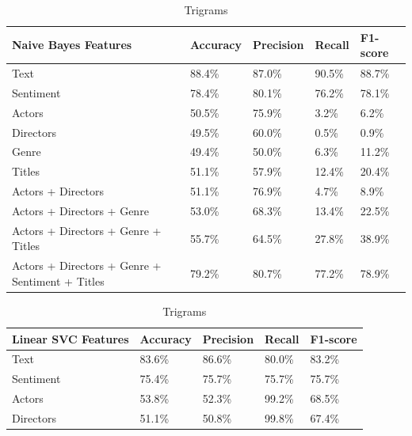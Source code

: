 \documentclass[
10pt, %
a4paper, %
oneside, %
headinclude,footinclude, %
] {book}%
\begin{document}
\begin{table}[hbtp]
\centering
\caption{Trigrams}
\label{Table 5}
\begin{tabular}{@{}lllll@{}}
\toprule
Naive Bayes Features                           & Accuracy & Precision & Recall & F1-score \\ \midrule
Text                              & 88.4\%       & 87.0\%          & 90.5\%       & 88.7\%         \\
Sentiment                         & 78.4\%         & 80.1\%          & 76.2\%       & 78.1\%         \\
Actors                            & 50.5\%         & 75.9\%          & 3.2\%       & 6.2\%         \\
Directors                         & 49.5\%         & 60.0\%          & 0.5\%       & 0.9\%         \\
Genre                             & 49.4\%         & 50.0\%          & 6.3\%       & 11.2\%         \\
Titles                            & 51.1\%         & 57.9\%          & 12.4\%       & 20.4\%         \\
Actors + Directors                        & 51.1\%         & 76.9\%          & 4.7\%       & 8.9\%         \\
Actors + Directors + Genre                        & 53.0\%         & 68.3\%          & 13.4\%       & 22.5\%         \\
Actors + Directors + Genre + Titles                       & 55.7\%         & 64.5\%          & 27.8\%       & 38.9\%         \\
Actors + Directors + Genre + Sentiment + Titles                    & 79.2\%         & 80.7\%          & 77.2\%       & 78.9\%         \\ 
\end{tabular}
\begin{tabular}{@{}lllll@{}}
\toprule
Linear SVC Features                           & Accuracy & Precision & Recall & F1-score \\ \midrule
Text                              & 83.6\%       & 86.6\%          & 80.0\%       & 83.2\%         \\
Sentiment                         & 75.4\%         & 75.7\%          & 75.7\%       & 75.7\%         \\
Actors                            & 53.8\%         & 52.3\%          & 99.2\%       & 68.5\%         \\
Directors                         & 51.1\%         & 50.8\%          & 99.8\%       & 67.4\%         \\

\end{tabular}
\end{table}
\end{document}
